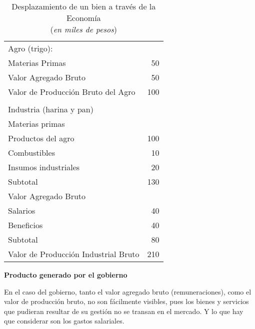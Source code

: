 \vspace{.5cm}
\begin{table}[H]
    \centering
    \caption{\\Desplazamiento de un bien a través de la Economía\\
        (\textit{en miles de pesos})}
    \vspace{.5cm}
    \begin{tabular}{lr}
        \hline
        Agro (trigo):                        &     \\
        Materias Primas                      & 50  \\
        Valor Agregado Bruto                 & 50  \\
        Valor de Producción Bruto del Agro   & 100 \\
        \hline                                     \\
        \hline
        Industria (harina y pan)             &     \\
        Materias primas                      &     \\
        \hspace{.3cm}Productos del agro      & 100 \\
        \hspace{.3cm}Combustibles            & 10  \\
        \hspace{.3cm}Insumos industriales    & 20  \\
        Subtotal                             & 130 \\
        \hline
        Valor Agregado Bruto                 &     \\
        \hspace{.3cm}Salarios                & 40  \\
        \hspace{.3cm}Beneficios              & 40  \\
        Subtotal                             & 80  \\
        \hline
        Valor de Producción Industrial Bruto & 210 \\
    \end{tabular}
\end{table}
\vspace{.5cm}

\textbf{Producto generado por el gobierno}

En el caso del gobierno,
tanto el valor agregado bruto (remuneraciones),
como el valor de producción bruto,
no son fácilmente visibles,
pues los bienes y servicios que pudieran resultar de su gestión no se transan
en el mercado.
Y lo que hay que considerar son los gastos salariales.

